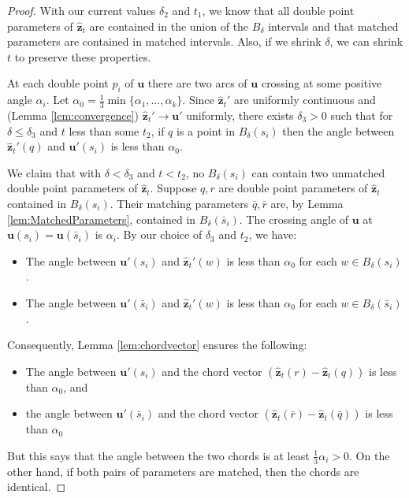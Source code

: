 \documentclass[12pt]{article}
\numberwithin{equation}{subsection}
\theoremstyle{definition}
\numberwithin{lem}{section}
\def\uu{\mathbf{u}}
\def\zhat{\mathbf{\hat{z}}}
\begin{document}
\begin{proof}
With our current values $\delta_2$ and $t_1$, we know that all double point parameters of $\zhat_t$ are contained in the union of the $B_\delta$ intervals and that matched parameters are contained in matched intervals.  Also, if we shrink $\delta$, we can shrink $t$ to preserve these properties.  

At each double point $p_i$ of $\uu$ there are  two arcs of $\uu$ crossing at some positive angle  $\alpha_i$. Let $\alpha_0 = \frac{1}{3}\mathop{min}\{\alpha_1, \ldots, \alpha_k\}$. Since $\zhat_t'$ are uniformly continuous and (Lemma \ref{lem:convergence})  $\zhat_t' \longrightarrow \uu'$ uniformly, there exists $\delta_3>0$ such that for $\delta \leq \delta_3$ and $t$ less than some $t_2$,  if $q$ is a point in $B_\delta(s_i)$ then the angle between $\zhat_t'(q)$ and $\uu'(s_i)$ is less than $\alpha_0$.

We claim that with $\delta < \delta_3$ and $t< t_2$, no $B_\delta(s_i)$ can contain two unmatched double point parameters of $\zhat_t$. Suppose $q,r$ are double point parameters of $\zhat_t$ contained in $B_\delta(s_i)$.  Their matching parameters $\bar{q}, \bar{r}$ are, by Lemma \ref{lem:MatchedParameters}, contained in $B_\delta(\bar{s}_i)$. 
The crossing angle of $\uu$ at $\uu(s_i) = \uu(\bar{s}_i)$ is $\alpha_i$.  By our choice of $\delta_3$ and $t_2$, we have:
\begin{itemize}
\item The angle between $\uu'(s_i)$ and $\zhat_t'(w)$ is less than $\alpha_0$ for each $w \in B_\delta(s_i)$.
\item The angle between $\uu'(\bar{s}_i)$ and $\zhat_t'(w)$ is less than $\alpha_0$ for each $w \in B_\delta(\bar{s}_i)$.
\end{itemize}
Consequently, Lemma \ref{lem:chordvector} ensures the following:
\begin{itemize}
\item The angle between $\uu'(s_i)$ and the chord vector $(\zhat_t(r) - \zhat_t(q))$ is less than $\alpha_0$, and
\item the angle between $\uu'(\bar{s}_i)$ and the chord vector $(\zhat_t(\bar{r}) - \zhat_t(\bar{q}))$ is less than $\alpha_0$
\end{itemize}
But this says that the angle between the two chords is at least $\frac{1}{3}\alpha_i >0$.  On the other hand, if both pairs of parameters are matched, then the chords are identical.
\end{proof}
\end{document}
